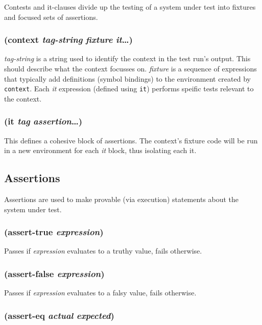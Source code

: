 \documentclass{article}
\begin{document}
Contests and it-clauses divide up the testing of a system under test into fixtures and focused
sets of assertions.

\subsubsection{(context \emph{tag-string} \emph{fixture} \emph{it}\ldots{})}

\emph{tag-string} is a string used to identify the context in the test run's output. This
should describe what the context focusses on. \emph{fixture} is a sequence of expressions that
typically add definitions (symbol bindings) to the environment created by \verb|context|.
Each \emph{it} expression (defined using \verb|it|) performs speific tests relevant to the
context.

\subsubsection{(it \emph{tag} \emph{assertion}\ldots{})}

This defines a cohesive block of assertions. The context's fixture code will be run in a new
environment for each \emph{it} block, thus isolating each it.

\subsection{Assertions}\label{sec:assertions}

Assertions are used to make provable (via execution) statements about the system under test.

\subsubsection{(assert-true \emph{expression})}

Passes if \emph{expression} evaluates to a truthy value, fails otherwise.

\subsubsection{(assert-false \emph{expression})}

Passes if \emph{expression} evaluates to a falsy value, fails otherwise.

\subsubsection{(assert-eq \emph{actual} \emph{expected})}
\end{document}
